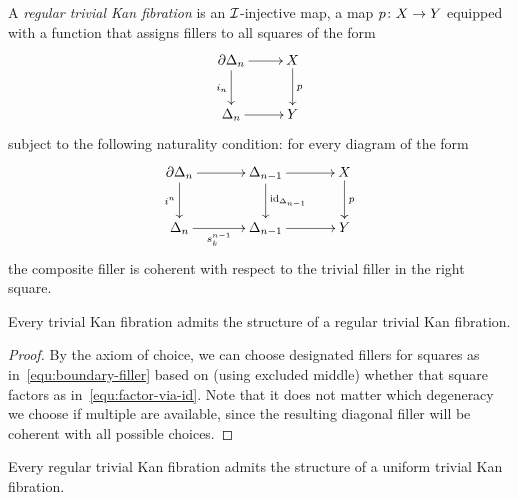 \documentclass[reqno,10pt,a4paper,oneside]{amsart}
\begin{document}
\begin{definition} A \emph{regular trivial Kan fibration} is an $\cal{I}$-injective map, \ie a map $p \co X \to Y$ 
equipped with a function that assigns fillers to all squares of the form
\begin{equation}
\label{equ:boundary-filler}
\xycenter{
\partial \Delta_n \ar[d]_{i_n} \ar[r] & X \ar[d]^{p} \\
\Delta_n \ar[r] & Y } 
\end{equation}
subject to the following naturality condition: for every diagram of the form
\begin{equation}
\label{equ:factor-via-id}
{\vcenter{\hbox{\xymatrix@C=1.2cm{
  \partial \Delta_n
  \ar[r]
  \ar[d]_{i^n}
&
  \Delta_{n-1}
  \ar[r]
  \ar[d]^{\id_{\Delta_{n-1}}}
&
  X
  \ar[d]^{p}
\\
  \Delta_n
  \ar[r]_-{s_k^{n-1}}
&
  \Delta_{n-1}
  \ar[r]
&
  Y
}}}}
\end{equation}
the composite filler is coherent with respect to the trivial filler in the right square. 
\end{definition}


\begin{lemma}[ZFC] \label{triv-Kan-is-regular}
Every trivial Kan fibration admits the structure of a regular trivial Kan fibration.
\end{lemma}

\begin{proof} By the axiom of choice, we can choose  designated fillers for squares as in~\eqref{equ:boundary-filler}
 based on (using excluded middle) whether that square factors as in~\eqref{equ:factor-via-id}. Note that it does not matter which degeneracy we choose if multiple are available, since the resulting diagonal filler will be coherent with 
 all possible choices.
\end{proof} 


\begin{lemma} \label{reg-triv-is-unif-Kan}
Every regular trivial Kan fibration admits the structure of a uniform trivial Kan fibration.
\end{lemma}
\end{document}
